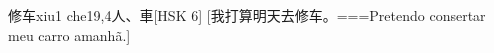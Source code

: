 \begin{EntryWithPhonetic}{修车}{xiu1 che1}{9,4}{⼈、⾞}[HSK 6]
  [我打算明天去修车。===Pretendo consertar meu carro amanhã.]
\end{EntryWithPhonetic}
